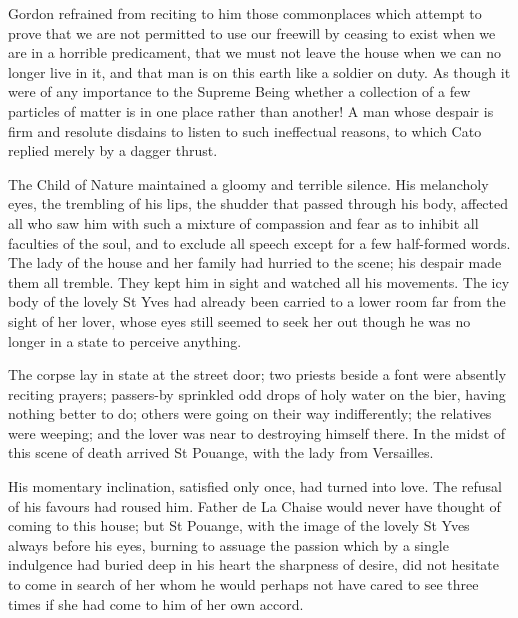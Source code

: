 \documentclass{article}
\begin{document}
\begin{center}
Gordon refrained from reciting to him those commonplaces which attempt to prove 
that we are not permitted to use our freewill by ceasing to exist when we are in 
a horrible predicament, that we must not leave the house when we can no longer 
live in it, and that man is on this earth like a soldier on duty. As though it 
were of any importance to the Supreme Being whether a collection of a few particles 
of matter is in one place rather than another! A man whose despair is firm and 
resolute disdains to listen to such ineffectual reasons, to which Cato replied 
merely by a dagger thrust. 

The Child of Nature maintained a gloomy and terrible silence. His melancholy eyes, 
the trembling of his lips, the shudder that passed through his body, affected all 
who saw him with such a mixture of compassion and fear as to inhibit all faculties 
of the soul, and to exclude all speech except for a few half-formed words. The 
lady of the house and her family had hurried to the scene; his despair made them 
all tremble. They kept him in sight and watched all his movements. The icy body 
of the lovely St Yves had already been carried to a lower room far from the sight 
of her lover, whose eyes still seemed to seek her out though he was no longer in 
a state to perceive anything. 

The corpse lay in state at the street door; two priests beside a font were absently 
reciting prayers; passers-by sprinkled odd drops of holy water on the bier, having 
nothing better to do; others were going on their way indifferently; the relatives 
were weeping; and the lover was near to destroying himself there. In the midst 
of this scene of death arrived St Pouange, with the lady from Versailles. 

His momentary inclination, satisfied only once, had turned into love. The refusal 
of his favours had roused him. Father de La Chaise would never have thought of 
coming to this house; but St Pouange, with the image of the lovely St Yves always 
before his eyes, burning to assuage the passion which by a single indulgence had 
buried deep in his heart the sharpness of desire, did not hesitate to come in search 
of her whom he would perhaps not have cared to see three times if she had come 
to him of her own accord. 


\end{center}
\end{document}
